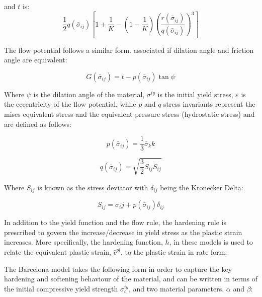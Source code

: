 and $t$ is:
\begin{equation}
\frac{1}{2}q\left(\bar{\sigma}_{ij}\right)\left [ 1+\frac{1}{K}-\left ( 1-\frac{1}{K} \right )\left ( \frac{r\left(\bar{\sigma}_{ij}\right)}{q\left(\bar{\sigma}_{ij}\right)} \right )^3 \right ]
\label{eqn:const9}
\end{equation}

The flow potential follows a similar form. associated if dilation angle and friction angle are equivalent:

\begin{equation}
G\left(\bar{\sigma}_{ij}\right)=t-p\left(\bar{\sigma}_{ij}\right)\tan\psi\label{eqn:const11}
\end{equation}

Where $\psi$ is the dilation angle of the material, $\sigma^{iy}$ is the initial yield stress, $\varepsilon$ is the eccentricity of the flow potential, while $p$ and $q$ stress invariants represent the mises equivalent stress and the equivalent pressure stress (hydrostatic stress) and are defined as follows:

\begin{equation}
p\left(\bar{\sigma}_{ij}\right)=\frac{1}{3}\bar{\sigma}_kk
\label{eqn:druc3}
\end{equation}

\begin{equation}
q\left(\bar{\sigma}_{ij}\right)=\sqrt{\frac{3}{2}S_{ij}S_{ij}}\label{eqn:druc4}
\end{equation}

Where $S_{ij}$ is known as the stress deviator with $\delta_{ij}$ being the Kronecker Delta:

\begin{equation}
S_{ij} = \sigma_ij + p\left(\bar{\sigma}_{ij}\right)\delta_{ij}
\end{equation}

In addition to the yield function and the flow rule, the hardening rule is prescribed to govern the increase/decrease in yield stress as the plastic strain increases. More specifically, the hardening function, $h$, in these models is used to relate the equivalent plastic strain, $\bar{\epsilon}^{pl}$,  to the plastic strain in rate form: 

The Barcelona model takes the following form in order to capture the key hardening and softening behaviour of the material, and can be written in terms of the initial compressive yield strength $\sigma_c^{iy}$, and two material parameters, $\alpha$ and $\beta$:

